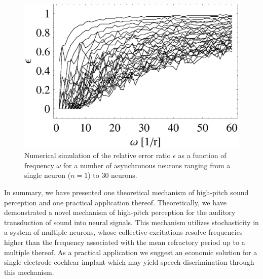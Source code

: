 \documentclass[%
 preprint,
 showpacs,
 showkeys,
 preprintnumbers,
 amsmath,amssymb,
 aps,
 prl,
  longbibliography,
 ]{revtex4-1}
\begin{document}
\begin{figure}
  \centering
  \includegraphics[width=150mm]{2006-highpitch-f2}
  \caption{Numerical simulation of the relative error ratio $\epsilon$ as a function of frequency
$\omega$
for a number of asynchronous neurons ranging from a single neuron ($n=1$) to 30 neurons.
}
\label{2006-highpitch-f3}
\end{figure}


In summary, we have presented one theoretical mechanism of high-pitch sound perception
and one practical application thereof.
Theoretically,  we have demonstrated a novel mechanism of high-pitch perception for the auditory transduction of sound into neural signals.
This mechanism utilizes stochasticity in a system of multiple neurons,
whose collective excitations resolve frequencies higher than the frequency
associated with the mean refractory period up to a multiple thereof.
As a practical application we suggest an economic solution for a single electrode cochlear implant
which may yield speech discrimination through this mechanism.


 
\end{document}
